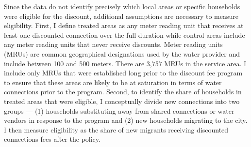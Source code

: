 \documentclass[12pt]{article}
\begin{document}
Since the data do not identify precisely which local areas or specific households were eligible for the discount, additional assumptions are necessary to measure eligibility.  First, I define treated areas as any meter reading unit that receives at least one discounted connection over the full duration while control areas include any meter reading units that never receive discounts.  Meter reading units (MRUs) are common geographical designations used by the water provider and include between 100 and 500 meters.  There are 3,757 MRUs in the service area.  I include only MRUs that were established long prior to the discount fee program to ensure that these areas are likely to be at saturation in terms of water connections prior to the program.  Second, to identify the share of households in treated areas that were eligible, I conceptually divide new connections into two groups --- (1) households substituting away from shared connections or water vendors in response to the program and (2) new households migrating to the city.  I then measure eligibility as the share of new migrants receiving discounted connections fees after the policy.
\end{document}
